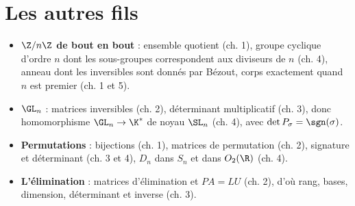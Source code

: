\section{Les autres fils}
\begin{itemize}
\item \textbf{$\Z/n\Z$ de bout en bout} : ensemble quotient (ch. 1), groupe cyclique d'ordre $n$ dont les sous-groupes correspondent aux diviseurs de $n$ (ch. 4), anneau dont les inversibles sont donnés par Bézout, corps exactement quand $n$ est premier (ch. 1 et 5).
\item \textbf{$\GL_n$} : matrices inversibles (ch. 2), déterminant multiplicatif (ch. 3), donc homomorphisme $\GL_n\to\K^*$ de noyau $\SL_n$ (ch. 4), avec $\det P_\sigma=\sgn(\sigma)$.
\item \textbf{Permutations} : bijections (ch. 1), matrices de permutation (ch. 2), signature et déterminant (ch. 3 et 4), $D_n$ dans $S_n$ et dans $O_2(\R)$ (ch. 4).
\item \textbf{L'élimination} : matrices d'élimination et $PA=LU$ (ch. 2), d'où rang, bases, dimension, déterminant et inverse (ch. 3).
\end{itemize}

\exercices

